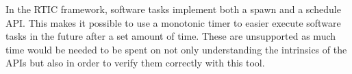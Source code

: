 In the RTIC framework, software tasks implement both a spawn and a schedule
API. This makes it possible to use a monotonic timer to easier execute software
tasks in the future after a set amount of time. These are unsupported as much
time would be needed to be spent on not only understanding the intrinsics of
the APIs but also in order to verify them correctly with this tool.

